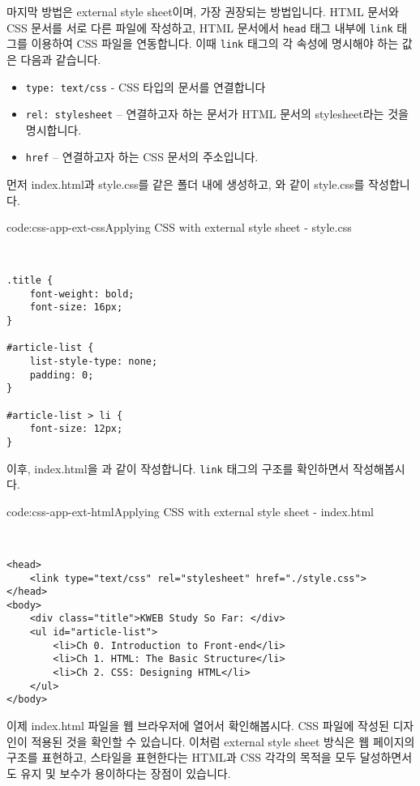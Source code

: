 마지막 방법은 external style sheet이며, 가장 권장되는 방법입니다. HTML 문서와 CSS 문서를 서로 다른 파일에 작성하고, HTML 문서에서 \verb|head| 태그 내부에 \verb|link| 태그를 이용하여 CSS 파일을 연동합니다. 이때 \verb|link| 태그의 각 속성에 명시해야 하는 값은 다음과 같습니다. 

\begin{itemize}
    \item \verb|type: text/css| - CSS 타입의 문서를 연결합니다
    \item \verb|rel: stylesheet| – 연결하고자 하는 문서가 HTML 문서의 stylesheet라는 것을 명시합니다.
    \item \verb|href| – 연결하고자 하는 CSS 문서의 주소입니다. 
\end{itemize}

먼저 index.html과 style.css를 같은 폴더 내에 생성하고, 와 같이 style.css를 작성합니다. 

\begin{codeenv}{code:css-app-ext-css}{Applying CSS with external style sheet - style.css}\begin{verbatim}


.title {
    font-weight: bold;
    font-size: 16px;
}

#article-list {
    list-style-type: none;
    padding: 0;
}

#article-list > li {
    font-size: 12px;
}
\end{verbatim}
\end{codeenv}

이후, index.html을 과 같이 작성합니다. \verb|link| 태그의 구조를 확인하면서 작성해봅시다. 

\begin{codeenv}{code:css-app-ext-html}{Applying CSS with external style sheet - index.html}\begin{verbatim}


<head>
    <link type="text/css" rel="stylesheet" href="./style.css">
</head>
<body>
    <div class="title">KWEB Study So Far: </div>
    <ul id="article-list">
        <li>Ch 0. Introduction to Front-end</li>
        <li>Ch 1. HTML: The Basic Structure</li>
        <li>Ch 2. CSS: Designing HTML</li>
    </ul>
</body>
\end{verbatim}
\end{codeenv}

이제 index.html 파일을 웹 브라우저에 열어서 확인해봅시다. CSS 파일에 작성된 디자인이 적용된 것을 확인할 수 있습니다. 이처럼 external style sheet 방식은 웹 페이지의 구조를 표현하고, 스타일을 표현한다는 HTML과 CSS 각각의 목적을 모두 달성하면서도 유지 및 보수가 용이하다는 장점이 있습니다. 
